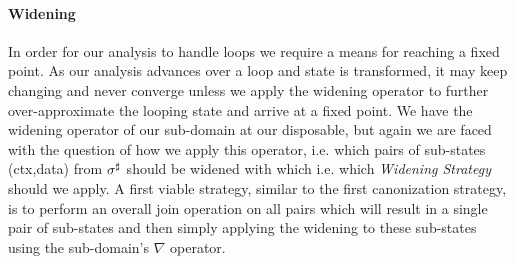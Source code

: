 \paragraph{Widening}
In order for our analysis to handle loops we require a means for reaching a fixed point. As our analysis advances over a loop and state is transformed, it may keep changing and never converge unless we apply the widening operator to further over-approximate the looping state and arrive at a fixed point. We have the widening operator of our sub-domain at our disposable, but again we are faced with the question of how we apply this operator, i.e. which pairs of sub-states \pair(ctx,data) from $\sigma^\sharp$ should be widened with which i.e. which \emph{Widening Strategy} should we apply. A first viable strategy, similar to the first canonization strategy, is to perform an overall join operation on all pairs which will result in a single pair of sub-states and then simply applying the widening to these sub-states using the sub-domain's $\nabla$ operator. %